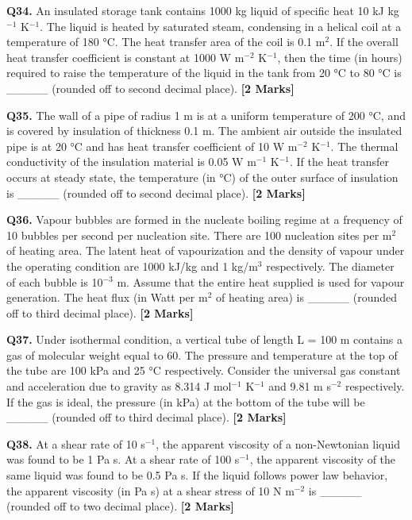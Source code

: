 \documentclass[11pt]{article}
\newcommand{\questionb}[2]{
    \noindent\textbf{Q#2.} #1 \hfill \textbf{[2 Marks]}
}
\begin{document}
\questionb{An insulated storage tank contains 1000 kg liquid of specific heat 10 kJ kg\(^{-1}\) K\(^{-1}\). The liquid is heated by saturated steam, condensing in a helical coil at a temperature of 180 °C. The heat transfer area of the coil is 0.1 m\(^2\). If the overall heat transfer coefficient is constant at 1000 W m\(^{-2}\) K\(^{-1}\), then the time (in hours) required to raise the temperature of the liquid in the tank from 20 °C to 80 °C is \_\_\_\_\_ (rounded off to second decimal place).}{34}
\vspace{0.5cm}

\questionb{The wall of a pipe of radius 1 m is at a uniform temperature of 200 °C, and is covered by insulation of thickness 0.1 m. The ambient air outside the insulated pipe is at 20 °C and has heat transfer coefficient of 10 W m\(^{-2}\) K\(^{-1}\). The thermal conductivity of the insulation material is 0.05 W m\(^{-1}\) K\(^{-1}\). If the heat transfer occurs at steady state, the temperature (in °C) of the outer surface of insulation is \_\_\_\_\_ (rounded off to second decimal place).}{35}
\vspace{0.5cm}


\questionb{Vapour bubbles are formed in the nucleate boiling regime at a frequency of 10 bubbles per second per nucleation site. There are 100 nucleation sites per m\(^2\) of heating area. The latent heat of vapourization and the density of vapour under the operating condition are 1000 kJ/kg and 1 kg/m\(^3\) respectively. The diameter of each bubble is 10\(^{-3}\) m. Assume that the entire heat supplied is used for vapour generation. The heat flux (in Watt per m\(^2\) of heating area) is \_\_\_\_\_ (rounded off to third decimal place).}{36}
\vspace{0.5cm}


\questionb{Under isothermal condition, a vertical tube of length L = 100 m contains a gas of molecular weight equal to 60. The pressure and temperature at the top of the tube are 100 kPa and 25 °C respectively. Consider the universal gas constant and acceleration due to gravity as 8.314 J mol\(^{-1}\) K\(^{-1}\) and 9.81 m s\(^{-2}\) respectively. If the gas is ideal, the pressure (in kPa) at the bottom of the tube will be \_\_\_\_\_ (rounded off to third decimal place).}{37}
\vspace{0.5cm}

\questionb{At a shear rate of 10 s\(^{-1}\), the apparent viscosity of a non-Newtonian liquid was found to be 1 Pa s. At a shear rate of 100 s\(^{-1}\), the apparent viscosity of the same liquid was found to be 0.5 Pa s. If the liquid follows power law behavior, the apparent viscosity (in Pa s) at a shear stress of 10 N m\(^{-2}\) is \_\_\_\_\_ (rounded off to two decimal place).}{38}
\vspace{0.5cm}
\end{document}

